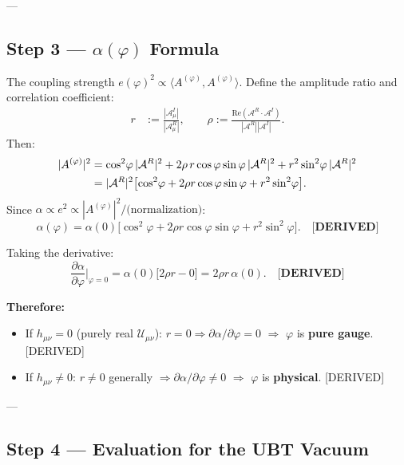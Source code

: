 ---

\subsection{Step 3 — $\alpha(\varphi)$ Formula}
\label{sec:phi_step3}

The coupling strength $e(\varphi)^2 \propto \langle A^{(\varphi)}, A^{(\varphi)}\rangle$.
Define the amplitude ratio and correlation coefficient:
\begin{align}
  r &:= \frac{|\mathcal{A}^I_\mu|}{|\mathcal{A}^R_\mu|}, \qquad
  \rho := \frac{\mathrm{Re}(\mathcal{A}^R \cdot \mathcal{A}^I)}{|\mathcal{A}^R||\mathcal{A}^I|}.
\end{align}
Then:
\begin{align}
  |A^{(\varphi)}|^2
  &= \cos^2\!\varphi\,|\mathcal{A}^R|^2
   + 2\rho\,r\cos\varphi\sin\varphi\,|\mathcal{A}^R|^2
   + r^2\sin^2\!\varphi\,|\mathcal{A}^R|^2 \notag\\
  &= |\mathcal{A}^R|^2\bigl[\cos^2\!\varphi + 2\rho r\cos\varphi\sin\varphi + r^2\sin^2\!\varphi\bigr].
\end{align}
Since $\alpha \propto e^2 \propto |A^{(\varphi)}|^2 / \text{(normalization)}$:
\begin{equation}
  \boxed{\alpha(\varphi) = \alpha(0)\bigl[\cos^2\!\varphi + 2\rho r\cos\varphi\sin\varphi + r^2\sin^2\!\varphi\bigr].}
  \label{eq:alpha_phi}
  \quad \textbf{[DERIVED]}
\end{equation}

Taking the derivative:
\begin{equation}
  \frac{\partial\alpha}{\partial\varphi}\bigg|_{\varphi=0}
  = \alpha(0)\bigl[2\rho r - 0\bigr]
  = 2\rho r\,\alpha(0).
  \label{eq:dalpha_dphi}
  \quad \textbf{[DERIVED]}
\end{equation}

\noindent \textbf{Therefore:}
\begin{itemize}
  \item If $h_{\mu\nu}=0$ (purely real $\mathcal{U}_{\mu\nu}$): $r=0 \Rightarrow \partial\alpha/\partial\varphi = 0$
    $\Rightarrow$ $\varphi$ is \textbf{pure gauge}. [DERIVED]
  \item If $h_{\mu\nu}\neq 0$: $r\neq 0$ generally $\Rightarrow \partial\alpha/\partial\varphi \neq 0$
    $\Rightarrow$ $\varphi$ is \textbf{physical}. [DERIVED]
\end{itemize}

---

\subsection{Step 4 — Evaluation for the UBT Vacuum}
\label{sec:phi_step4}

